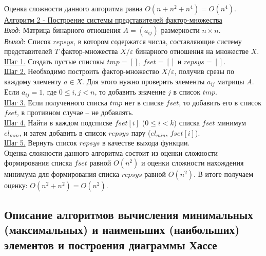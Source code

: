 \documentclass[bachelor, och, labwork]{shiza}
\begin{document}
            Оценка сложности данного алгоритма равна $O(n + n^2 + n^4) = O(n^4)$.\\

        \underline{Алгоритм 2 - Построение системы представителей фактор-множества}\\
            \textit{Вход}: Матрица бинарного отношения $A = (a_{ij})$ размерности $n \times n$.\\
            \textit{Выход}: Список $repsys$, в котором содержатся числа, составляющие систему представителей 
            $T$ фактор-множества $X/\varepsilon$ бинарного отношения на множестве $X$.\\
            \underline{Шаг 1.} Создать пустые списокы $tmp = []$, $fset = []$ и $repsys = []$.\\ 
            \underline{Шаг 2.} Необходимо построить фактор-множество $X/\varepsilon$, получив срезы по каждому элементу $a \in X$.
            Для этого нужно проверить элементы $a_{ij}$ матрицы $A$. Если $a_{ij} = 1$, где $0 \leq i, j < n$, то добавить значение $j$
            в список $tmp$. \\ 
            \underline{Шаг 3.} Если полученного списка $tmp$ нет в списке $fset$, то добавить его в список $fset$, в противном
            случае -- не добавлять.\\
            \underline{Шаг 4.} Найти в каждом подсписке $fset[i]$ ($0 \leq i < k$) списка $fset$ минимум $el_{min}$, и затем добавить
            в список $repsys$ пару ($el_{min}$, $fset[i]$). \\
            \underline{Шаг 5.} Вернуть список $repsys$ в качестве выхода функции. \\
            
            Оценка сложности данного алгоритма состоит из оценки сложности формирования списка $fset$ равной $O(n^2)$ и оценки сложности
            нахождения минимума для формирования списка $repsys$ равной $O(n^2)$. В итоге получаем оценку: $O(n^2 + n^2) = O(n^2)$.\\

    \subsection{Описание  алгоритмов  вычисления  минимальных  (максимальных)  и  наименьших (наибольших) элементов и
    построения диаграммы Хассе}
\end{document}
